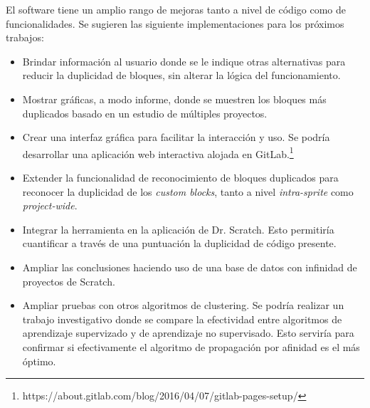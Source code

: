 \documentclass[a4paper, 12pt]{book}
\begin{document}
El software tiene un amplio rango de mejoras tanto a nivel de código como de funcionalidades. Se sugieren las siguiente implementaciones para los próximos trabajos:

\begin{itemize}
\item Brindar información al usuario donde se le indique otras alternativas para reducir la duplicidad de bloques, sin alterar la lógica del funcionamiento.
\item Mostrar gráficas, a modo informe, donde se muestren los bloques más duplicados basado en un estudio de múltiples proyectos.
\item Crear una interfaz gráfica para facilitar la interacción y uso. Se podría desarrollar una aplicación web interactiva alojada en GitLab.\footnote{https://about.gitlab.com/blog/2016/04/07/gitlab-pages-setup/}
\item Extender la funcionalidad de reconocimiento de bloques duplicados para reconocer la duplicidad de los \textit{custom blocks}, tanto a nivel \textit{intra-sprite} como \textit{project-wide}.
\item Integrar la herramienta en la aplicación de Dr. Scratch. Esto permitiría cuantificar a través de una puntuación la duplicidad de código presente.
\item Ampliar las conclusiones haciendo uso de una base de datos con infinidad de proyectos de Scratch.
\item Ampliar pruebas con otros algoritmos de clustering. Se podría realizar un trabajo investigativo donde se compare la efectividad entre algoritmos de aprendizaje supervizado y de aprendizaje no supervisado. Esto serviría para confirmar si efectivamente el algoritmo de propagación por afinidad es el más óptimo.
\end{itemize}





\cleardoublepage



\end{document}
